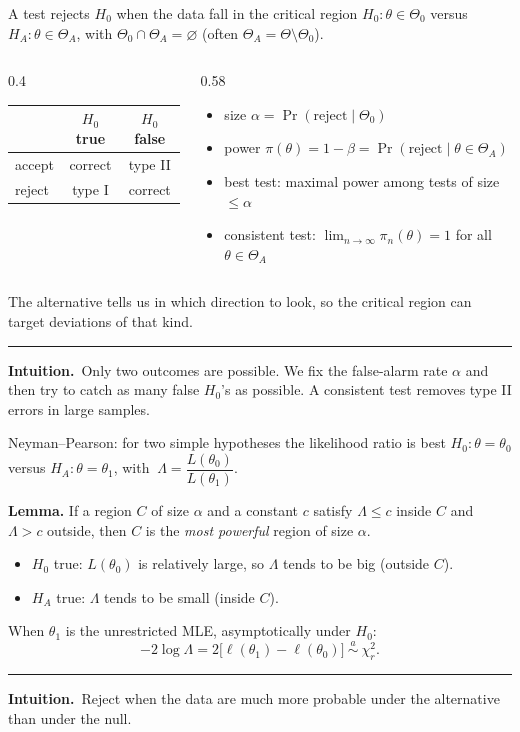 \documentclass[aspectratio=169,11pt,t]{beamer}
\newcommand{\asim}{\overset{a}{\sim}}
\newcommand{\intuition}[1]{\par\vfill
  {\color{intu}\rule{\linewidth}{0.4pt}}\par\vspace{1pt}
  {\small\color{intu}\textbf{Intuition.}\ #1}\par\vspace{2pt}}
\begin{document}
\begin{frame}{A test rejects $H_{0}$ when the data fall in the critical region}
$H_{0}\colon\theta\in\Theta_{0}$ versus $H_{A}\colon\theta\in\Theta_{A}$, with $\Theta_{0}\cap\Theta_{A}=\varnothing$ (often $\Theta_{A}=\Theta\setminus\Theta_{0}$).

\vspace{4pt}
\begin{columns}[T,onlytextwidth]
\begin{column}{0.4\textwidth}
\centering
\begin{tabular}{l|c|c}
 & $H_{0}$ true & $H_{0}$ false\\ \hline
 accept & correct & type II\\
 reject & type I & correct
\end{tabular}
\end{column}
\begin{column}{0.58\textwidth}
\small
\begin{itemize}
 \item size $\alpha=\Pr(\text{reject}\mid\Theta_{0})$
 \item power $\pi(\theta)=1-\beta=\Pr(\text{reject}\mid\theta\in\Theta_{A})$
 \item best test: maximal power among tests of size $\le\alpha$
 \item consistent test: $\lim_{n\to\infty}\pi_{n}(\theta)=1$ for all $\theta\in\Theta_{A}$
\end{itemize}
\end{column}
\end{columns}

\vspace{6pt}
The alternative tells us in which direction to look, so the critical region can target deviations of that kind.
\intuition{Only two outcomes are possible. We fix the false-alarm rate $\alpha$ and then try to catch as many false $H_{0}$'s as possible. A consistent test removes type II errors in large samples.}
\end{frame}

\begin{frame}{Neyman--Pearson: for two simple hypotheses the likelihood ratio is best}
$H_{0}\colon\theta=\theta_{0}$ versus $H_{A}\colon\theta=\theta_{1}$, with $\ \Lambda=\dfrac{L(\theta_{0})}{L(\theta_{1})}$.

\vspace{4pt}
\textbf{Lemma.} If a region $C$ of size $\alpha$ and a constant $c$ satisfy $\Lambda\le c$ inside $C$ and $\Lambda>c$ outside, then $C$ is the \emph{most powerful} region of size $\alpha$.
\begin{itemize}
 \item $H_{0}$ true: $L(\theta_{0})$ is relatively large, so $\Lambda$ tends to be big (outside $C$).
 \item $H_{A}$ true: $\Lambda$ tends to be small (inside $C$).
\end{itemize}
When $\theta_{1}$ is the unrestricted MLE, asymptotically under $H_{0}$:
\[ -2\log\Lambda=2\bigl[\ell(\theta_{1})-\ell(\theta_{0})\bigr]\ \asim\ \chi^{2}_{r}. \]
\intuition{Reject when the data are much more probable under the alternative than under the null.}
\end{frame}
\end{document}
